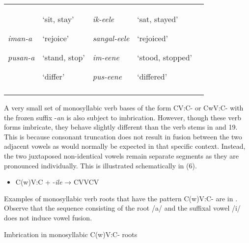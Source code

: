 \documentclass[output=paper]{langsci/langscibook}
\begin{document}
\begin{tabular}{lllll}
{\mdseries \emph{iman-a}}

\mdseries \emph{pusan-a} & {\mdseries ‘sit, stay’}

{\mdseries ‘rejoice’}

{\mdseries ‘stand, stop’}

\mdseries ‘differ’ & {\mdseries \emph{ik-eele}}

{\mdseries \emph{sangal-eele}}

{\mdseries \emph{im-eene}}

\mdseries \emph{pus-eene} & {\mdseries ‘sat, stayed’}

{\mdseries ‘rejoiced’}

{\mdseries ‘stood, stopped’}

{\mdseries ‘differed’}\\
\lspbottomrule
\end{tabular}
A very small set of monosyllabic verb bases of the form CV:C- or CwV:C- with the frozen suffix -\emph{an} is also subject to imbrication. However, though these verb forms imbricate, they behave slightly different than the verb stems in  and 19. This is because consonant truncation does not result in fusion between the two adjacent vowels as would normally be expected in that specific context. Instead, the two juxtaposed non-identical vowels remain separate segments as they are pronounced individually. This is illustrated schematically in (6). 

\begin{itemize}
\item \begin{stylelsLanginfo}
C(w)V:C + -\emph{ile}  → CVVCV
\end{stylelsLanginfo}\end{itemize}

Examples of monosyllabic verb roots that have the pattern C(w)V:C- are in . Observe that the sequence consisting of the root /a/ and the suffixal vowel /i/ does not induce vowel fusion. 

\begin{stylelsTableHeading}%
\begin{table}
\caption{Imbrication in monosyllabic C(w)V:C- roots}
\label{tab:21}
\end{table}\end{stylelsTableHeading}
\end{document}
